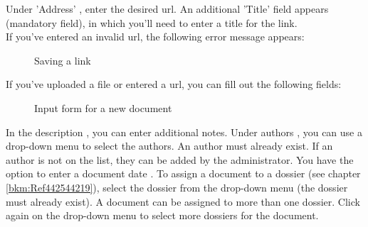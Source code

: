 Under 'Address' , enter the desired url. An additional 'Title' field  appears (mandatory field), in which you'll need to enter a title for the link.\\

If you've entered an invalid url, the following error message appears:

\begin{figure}[H]
\caption{Saving a link}
\end{figure}

\vspace{\baselineskip}

If you've uploaded a file or entered a url, you can fill out the following fields:

\begin{figure}[H]
\caption{Input form for a new document}
\end{figure}


In the description , you can enter additional notes. Under authors , you can use a drop-down menu to select the authors. An author must already exist. If an author is not on the list, they can be added by the administrator. You have the option to enter a document date . To assign a document to a dossier (see chapter \ref{bkm:Ref442544219}), select the dossier from the drop-down menu  (the dossier must already exist). A document can be assigned to more than one dossier. Click again on the drop-down menu to select more dossiers for the document.


